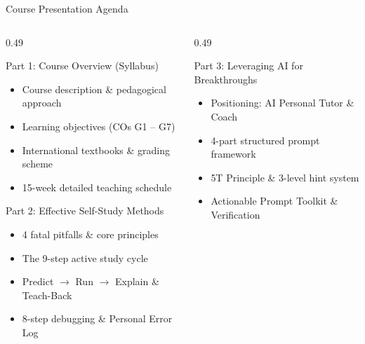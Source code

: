 \documentclass[aspectratio=169, 10pt]{beamer}
\begin{document}
\begin{frame}{Course Presentation Agenda}
  \begin{columns}[T]
    \begin{column}{0.49\textwidth}
      \begin{cbox}[primaryblue]{Part 1: Course Overview (Syllabus)}
        \footnotesize
        \begin{itemize}\setlength{\itemsep}{1pt}
          \item Course description \& pedagogical approach
          \item Learning objectives (COs G1 -- G7)
          \item International textbooks \& grading scheme
          \item 15-week detailed teaching schedule
        \end{itemize}
      \end{cbox}
      \vspace{0.1cm}
      \begin{cbox}[secondarygreen]{Part 2: Effective Self-Study Methods}
        \footnotesize
        \begin{itemize}\setlength{\itemsep}{1pt}
          \item 4 fatal pitfalls \& core principles
          \item The 9-step active study cycle
          \item Predict $\rightarrow$ Run $\rightarrow$ Explain \& Teach-Back
          \item 8-step debugging \& Personal Error Log
        \end{itemize}
      \end{cbox}
    \end{column}
    \begin{column}{0.49\textwidth}
      \begin{cbox}[accentorange]{Part 3: Leveraging AI for Breakthroughs}
        \footnotesize
        \begin{itemize}\setlength{\itemsep}{1pt}
          \item Positioning: AI Personal Tutor \& Coach
          \item 4-part structured prompt framework
          \item 5T Principle \& 3-level hint system
          \item Actionable Prompt Toolkit \& Verification

\end{itemize}
\end{cbox}
\end{column}
\end{columns}
\end{frame}
\end{document}
